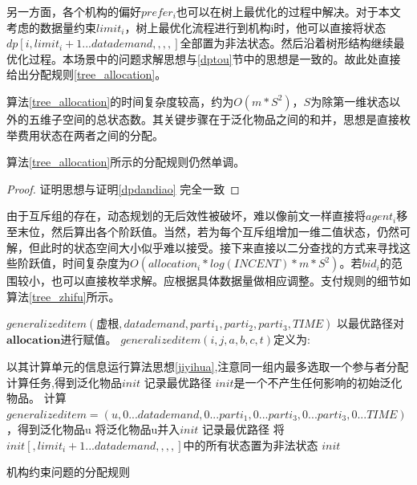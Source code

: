 \documentclass[promaster]{thesis-uestc}
\begin{document}
另一方面，各个机构的偏好$prefer_i$也可以在树上最优化的过程中解决。对于本文考虑的数据量约束$limit_i$，树上最优化流程进行到机构i时，他可以直接将状态$dp[i,limit_i+1...datademand,,,,]$全部置为非法状态。然后沿着树形结构继续最优化过程。本场景中的问题求解思想与\ref{dptou}节中的思想是一致的。故此处直接给出分配规则\ref{tree_allocation}。

算法\ref{tree_allocation}的时间复杂度较高，约为$O(m*S^2)$，$S$为除第一维状态以外的五维子空间的总状态数。其关键步骤在于泛化物品之间的和并，思想是直接枚举费用状态在两者之间的分配。

\begin{theorem}
 算法\ref{tree_allocation}所示的分配规则仍然单调。 
\end{theorem}

\begin{proof}
证明思想与证明\ref{dpdandiao} 完全一致
\end{proof}

由于互斥组的存在，动态规划的无后效性被破坏，难以像前文一样直接将$agent_i$移至末位，然后算出各个阶跃值。当然，若为每个互斥组增加一维二值状态，仍然可解，但此时的状态空间大小似乎难以接受。接下来直接以二分查找的方式来寻找这些阶跃值，时间复杂度为$O(allocation_i*log(INCENT)*m*S^2)$。若$bid_i$的范围较小，也可以直接枚举求解。应根据具体数据量做相应调整。支付规则的细节如算法\ref{tree_zhifu}所示。

\begin{algorithm}[h]
    $generalizeditem(\text{虚根},datademand,parti_1,parti_2,parti_3,TIME)$\;
    以最优路径对$\mathbf{allocation}$进行赋值。\;
    \;
    $generalizeditem(i,j,a,b,c,t)$定义为:\;
    
    {
        以其计算单元的信息运行算法思想\ref{jiyihua},注意同一组内最多选取一个参与者分配计算任务,得到泛化物品$init$\;
        记录最优路径\;
    }{
        $init$是一个不产生任何影响的初始泛化物品。
    }
    {
        计算$generalizeditem=(u,0...datademand,0...parti_1,0...parti_3,0...parti_3,0...TIME)$，得到泛化物品u\;
        将泛化物品u并入$init$\;
        记录最优路径\;
    }
    将$init[,limit_i+1...datademand,,,,]$中的所有状态置为非法状态\;
    \Return $init$\;
\caption{机构约束问题的分配规则}
\label{tree_allocation}
\end{algorithm}
\end{document}
